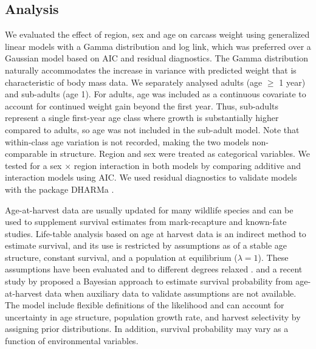 \documentclass[12pt,a4paper,final,abstract=true,headings=small]{scrartcl}
\begin{document}
\subsection*{Analysis}

We evaluated the effect of region, sex and age on carcass weight using generalized linear models with a Gamma distribution and log link, which was preferred over a Gaussian model based on AIC and residual diagnostics. The Gamma distribution naturally accommodates the increase in variance with predicted weight that is characteristic of body mass data. We separately analysed adults (age $\geq$ 1 year) and sub-adults (age 1). For adults, age was included as a continuous covariate to account for continued weight gain beyond the first year. Thus, sub-adults represent a single first-year age class where growth is substantially higher compared to adults, so age was not included in the sub-adult model. Note that within-class age variation is not recorded, making the two models non-comparable in structure. Region and sex were treated as categorical variables. We tested for a sex $\times$ region interaction in both models by comparing additive and interaction models using AIC. We used residual diagnostics to validate models with the package DHARMa \citep{hartigDHARMaResidualDiagnostics2022}.

Age-at-harvest data are usually updated for many wildlife species and can be used to supplement survival estimates from mark-recapture and known-fate studies. Life-table analysis based on age at harvest data is an indirect method to estimate survival, and its use is restricted by assumptions as of a stable age structure, constant survival, and a population at equilibrium ($\lambda = 1$). These assumptions have been evaluated and to different degrees relaxed \citep{udevitzEstimatingSurvivalRates1998}. and a recent study by \citet{skellyFlexibleBayesianApproach} proposed a Bayesian approach to estimate survival probability from age-at-harvest data when auxiliary data to validate assumptions are not available. The model include flexible definitions of the likelihood and can account for uncertainty in age structure, population growth rate, and harvest selectivity by assigning prior distributions. In addition,  survival probability may vary as a function of environmental variables.
\end{document}
